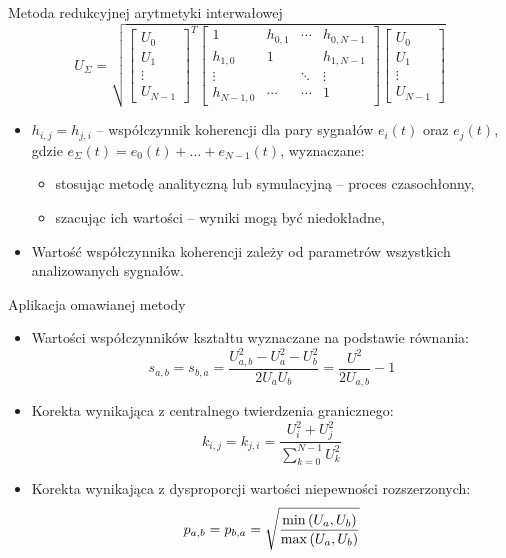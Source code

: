 \documentclass[12pt, polish, aspectratio = 169]{slides}
\begin{document}
\begin{frame}{Metoda redukcyjnej arytmetyki interwałowej}
\begin{equation}
U_{\Sigma} = \sqrt{
\begin{bmatrix}
U_{0} \\ U_{1} \\ \vdots \\ U_{N-1}
\end{bmatrix}^{T}
\begin{bmatrix}
1         & h_{0,1} & \cdots & h_{0,N-1} \\
h_{1,0}   & 1       &        & h_{1,N-1} \\
\vdots    &         & \ddots & \vdots    \\
h_{N-1,0} & \cdots  & \cdots & 1
\end{bmatrix}
\begin{bmatrix}
U_{0} \\ U_{1} \\ \vdots \\ U_{N-1}
\end{bmatrix}}
\label{eq:unc_matrix}
\end{equation}
\begin{itemize}
\item $h_{i,j} = h_{j,i}$ -- współczynnik koherencji dla pary sygnałów $e_{i}(t)$ oraz $e_{j}(t)$, gdzie $e_{\Sigma}(t) = e_{0}(t) + \hdots + e_{N-1}(t)$, wyznaczane:
	\begin{itemize}
	\item stosując metodę analityczną lub symulacyjną -- proces czasochłonny,
	\item szacując ich wartości -- wyniki mogą być niedokładne,
	\end{itemize}
\item Wartość współczynnika koherencji zależy od parametrów wszystkich analizowanych sygnałów.
\end{itemize}
\end{frame}

\begin{frame}{Aplikacja omawianej metody}
\begin{itemize}
\item Wartości współczynników kształtu wyznaczane na podstawie równania:
\begin{equation}
s_{a,b} = s_{b,a} = \frac{U_{a,b}^{2} - U_{a}^{2} - U_{b}^{2}}{2 U_{a} U_{b}} = \frac{U^{2}}{2 U_{a,b}} - 1 \label{eq:unc_shapertwo}
\end{equation}
\item Korekta wynikająca z centralnego twierdzenia granicznego:
\begin{equation}
k_{i,j} = k_{j,i} = \frac{U_{i}^{2} + U_{j}^{2}}{\sum _{k = 0} ^{N-1} U_{k}^{2}} \label{eq:unc_cohercorrb}
\end{equation}
\item Korekta wynikająca z dysproporcji wartości niepewności rozszerzonych:
\begin{equation}
p_{a,b} = p_{b,a} = \sqrt{\frac{\min \left(U_{a}, U_{b}\right)}{\max \left(U_{a}, U_{b}\right)}} \label{eq:unc_cohercorra}
\end{equation}
\end{itemize}
\end{frame}
\end{document}
